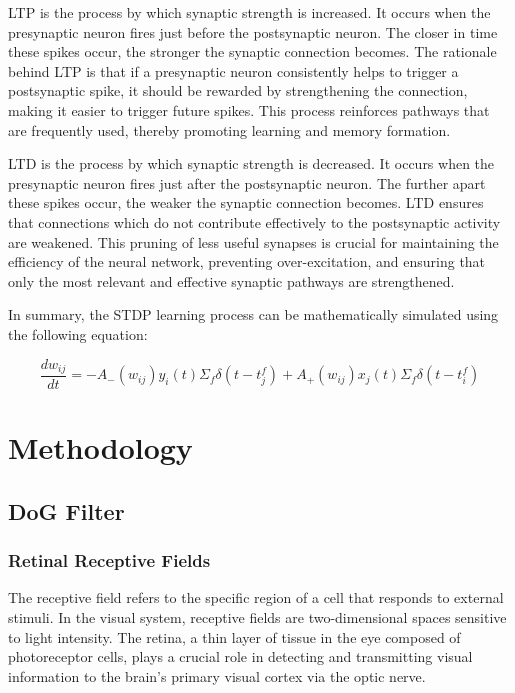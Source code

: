 \documentclass[12pt]{article}
\begin{document}
LTP is the process by which synaptic strength is increased. It occurs when the presynaptic neuron fires just before the postsynaptic neuron. The closer in time these spikes occur, the stronger the synaptic connection becomes. The rationale behind LTP is that if a presynaptic neuron consistently helps to trigger a postsynaptic spike, it should be rewarded by strengthening the connection, making it easier to trigger future spikes. This process reinforces pathways that are frequently used, thereby promoting learning and memory formation.


LTD is the process by which synaptic strength is decreased. It occurs when the presynaptic neuron fires just after the postsynaptic neuron. The further apart these spikes occur, the weaker the synaptic connection becomes. LTD ensures that connections which do not contribute effectively to the postsynaptic activity are weakened. This pruning of less useful synapses is crucial for maintaining the efficiency of the neural network, preventing over-excitation, and ensuring that only the most relevant and effective synaptic pathways are strengthened.



In summary, the STDP learning process can be mathematically simulated using the following equation:

 $$  \frac{dw_{ij}}{dt} = -A_-(w_{ij})y_i(t)\Sigma_f \delta(t-t_j^f) + A_+(w_{ij})x_j(t)\Sigma_f \delta(t-t_i^f)$$
	
	
\section{Methodology}


\subsection{DoG Filter}

	\subsubsection{Retinal Receptive Fields}
	
	The receptive field refers to the specific region of a cell that responds to external stimuli. In the visual system, receptive fields are two-dimensional spaces sensitive to light intensity. The retina, a thin layer of tissue in the eye composed of photoreceptor cells, plays a crucial role in detecting and transmitting visual information to the brain's primary visual cortex via the optic nerve.
\end{document}
